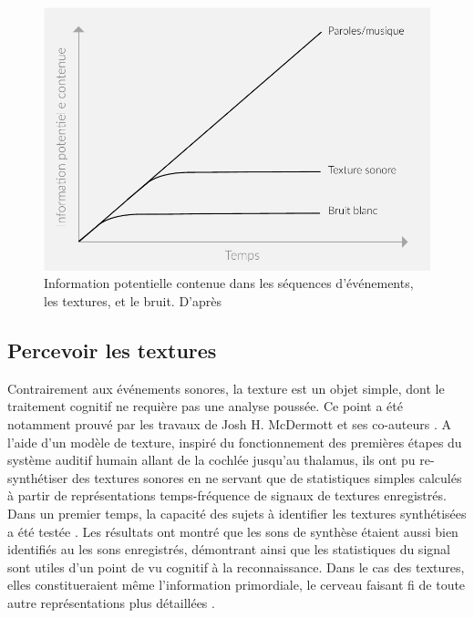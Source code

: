\begin{figure}[bth]
        \myfloatalign
        \includegraphics[width=\linewidth]{gfx/texture}
        \caption[Information potentielle contenue dans les séquences d'événements, les textures, et le bruit]{Information potentielle contenue dans les séquences d'événements, les textures, et le bruit. D'après \citep{saint1995classification}}\label{fig:texture}
\end{figure}

\subsection{Percevoir les textures}

Contrairement aux événements sonores, la texture est un objet simple, dont le traitement cognitif ne requière pas une analyse poussée. Ce point a été notamment prouvé par les travaux de Josh H. McDermott et ses co-auteurs \citep{mcdermott2011sound,mcdermott2013summary}. A l'aide d'un modèle de texture, inspiré du fonctionnement des premières étapes du système auditif humain allant de la cochlée jusqu'au thalamus, ils ont pu re-synthétiser des textures sonores en ne servant que de statistiques simples calculés à partir de représentations temps-fréquence de signaux de textures enregistrés. Dans un premier temps, la capacité des sujets à identifier les textures synthétisées a été testée \citep{mcdermott2011sound}. Les résultats ont montré que les sons de synthèse étaient aussi bien identifiés au les sons enregistrés, démontrant ainsi que les statistiques du signal sont utiles d'un point de vu cognitif à la reconnaissance. Dans le cas des textures, elles constitueraient même l'information primordiale, le cerveau faisant fi de toute autre représentations plus détaillées \citep{nelken2013ear}.

